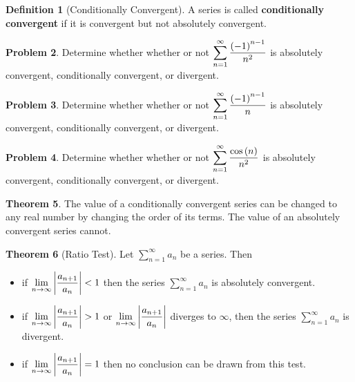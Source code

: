 \documentclass[letterpaper, twoside, 12pt]{book}
\theoremstyle{definition}
\newtheorem{theorem}{Theorem}
\theoremstyle{definition}
\newtheorem{definition}[theorem]{Definition}
\newtheorem{problem}[theorem]{Problem}
\newcommand{\ds}{\ensuremath{\displaystyle}}
\begin{document}
\begin{definition}[Conditionally Convergent]
 A series is called \textbf{conditionally convergent} if it is convergent but {\sc not} absolutely convergent.
\end{definition}

\begin{problem}
 Determine whether whether or not $\ds \sum_{n=1}^{\infty} \frac{\left(-1\right)^{n-1}}{n^2}$ is absolutely convergent, conditionally convergent, or divergent.
\end{problem}

\vfill

\begin{problem}
 Determine whether whether or not $\ds \sum_{n=1}^{\infty} \frac{\left(-1\right)^{n-1}}{n}$ is absolutely convergent, conditionally convergent, or divergent.
\end{problem}

\vfill

\begin{problem}
 Determine whether whether or not $\ds \sum_{n=1}^{\infty} \frac{\cos\left(n\right)}{n^2}$ is absolutely convergent, conditionally convergent, or divergent.
\end{problem}

\vfill

\begin{theorem}
  The value of a conditionally convergent series can be changed to any real
  number by changing the order of its terms. The value of an absolutely
  convergent series cannot.
\end{theorem}

\newpage

\begin{theorem}[Ratio Test]
 Let $\sum_{n=1}^{\infty} a_n$ be a series.  Then
 \begin{itemize}
  \item if $\ds \lim_{n \rightarrow \infty} \left| \frac{a_{n+1}}{a_{n}} \right| < 1$
  then the series $\sum_{n = 1}^{\infty} a_n$ is absolutely convergent.
  \item if $\ds \lim_{n \rightarrow \infty} \left| \frac{a_{n+1}}{a_{n}} \right| > 1$
  or $\ds \lim_{n \rightarrow \infty} \left| \frac{a_{n+1}}{a_{n}} \right|$
  diverges to $\infty$,
  then the series $\sum_{n = 1}^{\infty} a_n$ is divergent.
  \item if $\ds \lim_{n \rightarrow \infty} \left| \frac{a_{n+1}}{a_{n}} \right| = 1$
  then no conclusion can be drawn from this test.
 \end{itemize}
\end{theorem}
\end{document}
